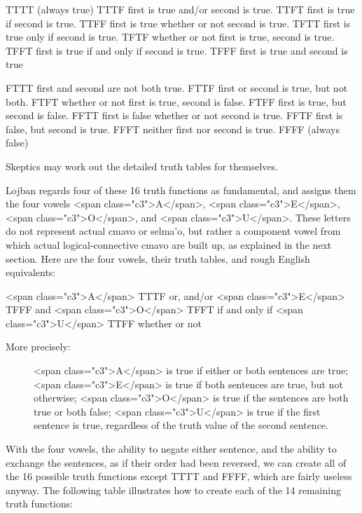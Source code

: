    TTTT    (always true)
    TTTF    first is true and/or second is true.
    TTFT    first is true if second is true.
    TTFF    first is true whether or not second is true.
    TFTT    first is true only if second is true.
    TFTF    whether or not first is true, second is true.
    TFFT    first is true if and only if second is true.
    TFFF    first is true and second is true

FTTT    first and second are not both true.
    FTTF    first or second is true, but not both.
    FTFT    whether or not first is true, second is false.
    FTFF    first is true, but second is false.
    FFTT    first is false whether or not second is true.
    FFTF    first is false, but second is true.
    FFFT    neither first nor second is true.
    FFFF    (always false)

Skeptics may work out the detailed truth tables for
    themselves.



Lojban regards four of these 16 truth functions as
    fundamental, and assigns them the four vowels <span
    class="c3">A</span>, <span class="c3">E</span>, <span
    class="c3">O</span>, and <span class="c3">U</span>. These
    letters do not represent actual cmavo or selma'o, but rather a
    component vowel from which actual logical-connective cmavo are
    built up, as explained in the next section. Here are the four
    vowels, their truth tables, and rough English equivalents:

   <span class="c3">A</span>   TTTF    or, and/or
    <span class="c3">E</span>   TFFF    and
    <span class="c3">O</span>   TFFT    if and only if
    <span class="c3">U</span>   TTFF    whether or not

More precisely:
\begin{description}
\item[] <span class="c3">A</span> is true if either or both sentences are true; <span class="c3">E</span> is true if both sentences are true, but not otherwise; <span class="c3">O</span> is true if the sentences are both true or both false; <span class="c3">U</span> is true if the first sentence is true, regardless of the truth value of the second sentence.
\end{description}

With the four vowels, the ability to negate either sentence,
    and the ability to exchange the sentences, as if their order
    had been reversed, we can create all of the 16 possible truth
    functions except TTTT and FFFF, which are fairly useless
    anyway. The following table illustrates how to create each of
    the 14 remaining truth functions: 

